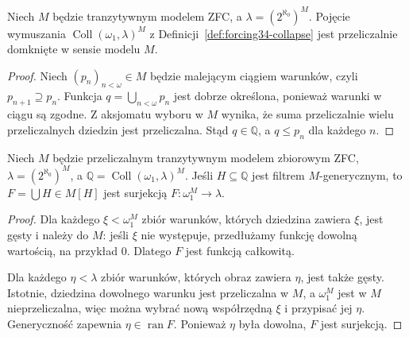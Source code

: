 \begin{lemat}
\label{lem:forcing34-collapse-closed}
Niech $M$ będzie tranzytywnym
modelem ZFC, a
$\lambda=(2^{\aleph_0})^M$.
Pojęcie wymuszania
$\operatorname{Coll}(\omega_1,\lambda)^M$
z Definicji~\ref{def:forcing34-collapse}
jest przeliczalnie domknięte
w sensie modelu $M$.
\end{lemat}
\begin{proof}
Niech $(p_n)_{n<\omega}\in M$
będzie malejącym ciągiem
warunków, czyli $p_{n+1}\supseteq p_n$.
Funkcja $q=\bigcup_{n<\omega}p_n$
jest dobrze określona, ponieważ
warunki w ciągu są zgodne.
Z aksjomatu wyboru w $M$
wynika, że suma przeliczalnie
wielu przeliczalnych dziedzin
jest przeliczalna. Stąd
$q\in\mathbb Q$, a $q\leq p_n$
dla każdego $n$.
\end{proof}

\begin{lemat}
\label{lem:forcing34-collapse-surjection}
Niech $M$ będzie przeliczalnym
tranzytywnym modelem zbiorowym ZFC,
$\lambda=(2^{\aleph_0})^M$, a
$\mathbb Q=\operatorname{Coll}(\omega_1,\lambda)^M$.
Jeśli $H\subseteq\mathbb Q$
jest filtrem $M$-generycznym,
to $F=\bigcup H\in M[H]$
jest surjekcją
$F:\omega_1^M\longrightarrow\lambda$.
\end{lemat}
\begin{proof}
Dla każdego $\xi<\omega_1^M$
zbiór warunków, których dziedzina
zawiera $\xi$, jest gęsty i należy
do $M$: jeśli $\xi$ nie występuje,
przedłużamy funkcję dowolną
wartością, na przykład $0$.
Dlatego $F$ jest funkcją całkowitą.

Dla każdego $\eta<\lambda$
zbiór warunków, których obraz
zawiera $\eta$, jest także gęsty.
Istotnie, dziedzina dowolnego
warunku jest przeliczalna w $M$,
a $\omega_1^M$ jest w $M$
nieprzeliczalna, więc można
wybrać nową współrzędną $\xi$
i przypisać jej $\eta$.
Generyczność zapewnia
$\eta\in\operatorname{ran}F$.
Ponieważ $\eta$ była dowolna,
$F$ jest surjekcją.
\end{proof}

